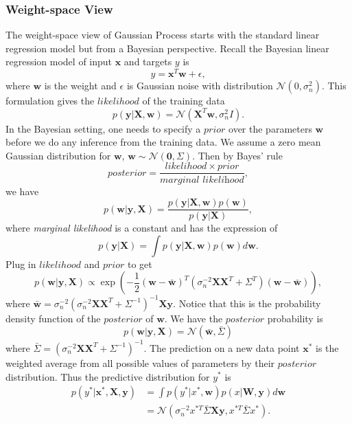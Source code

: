 \documentclass[11pt,a4paper]{article}
\theoremstyle{definition}
\numberwithin{equation}{section}
\let\vec\mathbf
\begin{document}
	\subsubsection{Weight-space View}
	The weight-space view of Gaussian Process starts with the standard linear regression model but from a Bayesian perspective. Recall the Bayesian linear regression model of input $\vec x$ and targets $y$ is
	\begin{equation}
	y = \vec x^T\vec w + \epsilon,
	\end{equation}
	where $\vec w$ is the weight and $\epsilon$ is Gaussian noise with distribution $\mathcal N(0,\sigma^2_n)$. This formulation gives the $likelihood$ of the training data
	\begin{equation}
	p(\vec y|\vec X, \vec w) = \mathcal N(\vec X^T\vec w,\sigma^2_nI).
	\end{equation}
	In the Bayesian setting, one needs to specify a $prior$ over the parameters $\vec w$ before we do any inference from the training data\cite[sec 2.1]{RandW}. We assume a zero mean Gaussian distribution for $\vec w$, $\vec w \sim \mathcal N(\vec 0, \Sigma)$. Then by Bayes' rule
	\begin{equation}
	posterior = \frac{likelihood \times prior}{\textit{marginal likelihood}},
	\end{equation}
	we have
	\begin{equation}
	p(\vec w|\vec y, \vec X) = \frac{p(\vec y|\vec X, \vec w)p(\vec w)}{p(\vec y | \vec X)},
	\end{equation}
	where \textit{marginal likelihood} is a constant and has the expression of
	\begin{equation}
	p(\vec y | \vec X) = \int p(\vec y|\vec X, \vec w) p(\vec w)d\vec w.
	\end{equation}
	Plug in $likelihood$ and $prior$ to get
	\begin{equation}
	p(\vec w|\vec y, \vec X) \propto \exp\left(-\frac{1}{2}(\vec w-\vec{\bar w})^T(\sigma^{-2}_n \vec X \vec X^T +\Sigma^T)(\vec w-\vec{\bar w})\right),
	\end{equation}
	where $\vec{\bar w}=\sigma^{-2}_n(\sigma^{-2}_n\vec X\vec X^T+\Sigma^{-1})^{-1}\vec X\vec y$. Notice that this is the probability density function of the $posterior$ of $\vec w$. We have the $posterior$ probability is
	\begin{equation}
	p(\vec w|\vec y, \vec X) = \mathcal N(\vec{\bar w},\bar \Sigma)
	\end{equation}
	where $\bar \Sigma = (\sigma^{-2}_n\vec X\vec X^T+\Sigma^{-1})^{-1}$.
	The prediction on a new data point $\vec x^*$ is the weighted average from all possible values of parameters by their $posterior$ distribution. Thus the predictive distribution for $y^*$ is 
	\begin{equation}\label{weight_space_pred}
	\begin{split}
	p(y^*|\vec x^*,\vec X, \vec y) &= \int p(y^*|x^*,\vec w)p(x|\vec W,\vec y)d\vec w\\
	&=\mathcal N\left(\sigma^{-2}_nx^{*T}\bar \Sigma \vec X\vec y,x^{*T}\bar\Sigma x^*\right).
	\end{split}
	\end{equation}
	
\end{document}
